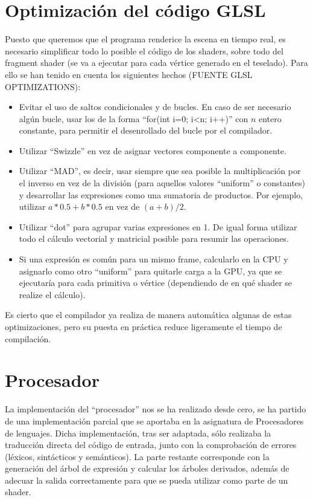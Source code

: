 \section*{Optimización del código GLSL}
	Puesto que queremos que el programa renderice la escena en tiempo real, es necesario simplificar todo lo posible el código de los shaders, sobre todo del fragment shader (se va a ejecutar para cada vértice generado en el teselado). Para ello se han tenido en cuenta los siguientes hechos (FUENTE GLSL OPTIMIZATIONS):
	\begin{itemize}
		\item Evitar el uso de saltos condicionales y de bucles. En caso de ser necesario algún bucle, usar los de la forma ``for(int i=$0$; i<n; i++)'' con $n$ entero constante, para permitir el desenrollado del bucle por el compilador.
		\item Utilizar ``Swizzle'' en vez de asignar vectores componente a componente.
		\item Utilizar ``MAD'', es decir, usar siempre que sea posible la multiplicación por el inverso en vez de la división (para aquellos valores ``uniform'' o constantes) y desarrollar las expresiones como una sumatoria de productos. Por ejemplo, utilizar $a*0.5 + b*0.5$ en vez de $(a+b)/2$.
		\item Utilizar ``dot'' para agrupar varias expresiones en 1. De igual forma utilizar todo el cálculo vectorial y matricial posible para resumir las operaciones.
		\item Si una expresión es común para un mismo frame, calcularlo en la CPU y asignarlo como otro ``uniform'' para quitarle carga a la GPU, ya que se ejecutaría para cada primitiva o vértice (dependiendo de en qué shader se realize el cálculo).
	\end{itemize}
	
	Es cierto que el compilador ya realiza de manera automática algunas de estas optimizaciones, pero su puesta en práctica reduce ligeramente el tiempo de compilación.

\section*{Procesador}
La implementación del ``procesador'' nos se ha realizado desde cero, se ha partido de una implementación parcial que se aportaba en la asignatura de Procesadores de lenguajes. Dicha implementación, tras ser adaptada, sólo realizaba la traducción directa del código de entrada, junto con la comprobación de errores (léxicos, sintácticos y semánticos). La parte restante corresponde con la generación del árbol de expresión y calcular los árboles derivados, además de adecuar la salida correctamente para que se pueda utilizar como parte de un shader.

